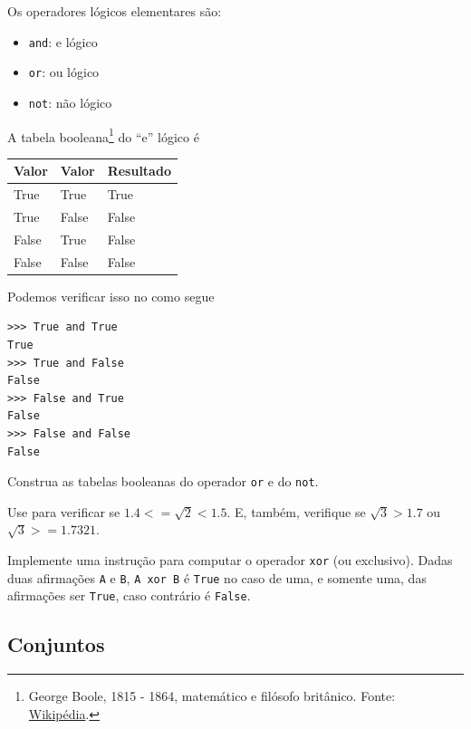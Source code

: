 \documentclass[12pt]{article}
\begin{document}
Os operadores lógicos elementares são:
\begin{itemize}
\item[]\lstinline+and+: e lógico
\item[]\lstinline+or+: ou lógico
\item[]\lstinline+not+: não lógico
\end{itemize}

A tabela booleana\footnote{George Boole, 1815 - 1864, matemático e filósofo britânico. Fonte: \href{https://pt.wikipedia.org/wiki/George\_Boole}{Wikipédia}.} do ``e'' lógico é
\begin{center}
  \begin{tabular}[H]{ll|l}
    Valor & Valor & Resultado \\\hline
    True & True & True \\
    True & False & False \\
    False & True & False \\
    False & False & False \\\hline
  \end{tabular}
\end{center}
Podemos verificar isso no {\python} como segue
\begin{lstlisting}
>>> True and True
True
>>> True and False
False
>>> False and True
False
>>> False and False
False
\end{lstlisting}

\begin{exr}
  Construa as tabelas booleanas do operador \lstinline+or+ e do \lstinline+not+.
\end{exr}

\begin{exr}
  Use {\python} para verificar se $1.4 <= \sqrt{2} < 1.5$. E, também, verifique se $\sqrt{3} > 1.7$ ou $\sqrt{3} >= 1.7321$.
\end{exr}

\begin{exr}
  Implemente uma instrução para computar o operador \lstinline+xor+ (ou exclusivo). Dadas duas afirmações \lstinline+A+ e \lstinline+B+, \lstinline+A xor B+ é \lstinline+True+ no caso de uma, e somente uma, das afirmações ser \lstinline+True+, caso contrário é \lstinline+False+.
\end{exr}


\subsection{Conjuntos}
\end{document}
